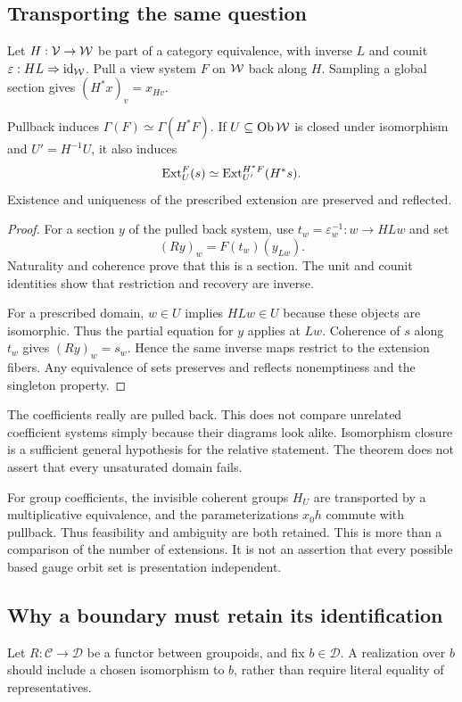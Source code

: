 \label{sec:relative}
\subsection{Transporting the same question}
Let \(H:\mathcal V\to\mathcal W\) be part of a category equivalence, with inverse \(L\) and counit \(\varepsilon:HL\Rightarrow\operatorname{id}_\mathcal W\). Pull a view system \(F\) on \(\mathcal W\) back along \(H\). Sampling a global section gives \((H^*x)_v=x_{Hv}\).

\begin{proposition}\label{KS37}
Pullback induces \(\Gamma(F)\simeq\Gamma(H^*F)\). If \(U\subseteq\operatorname{Ob}\mathcal W\) is closed under isomorphism and \(U'=H^{-1}U\), it also induces
\[
 \operatorname{Ext}_U^F(s)\simeq\operatorname{Ext}_{U'}^{H^*F}(H^*s).
\]
Existence and uniqueness of the prescribed extension are preserved and reflected.
\end{proposition}
\begin{proof}
For a section \(y\) of the pulled back system, use \(t_w=\varepsilon_w^{-1}:w\to HLw\) and set
\[
 (Ry)_w=F(t_w)(y_{Lw}).
\]
Naturality and coherence prove that this is a section. The unit and counit identities show that restriction and recovery are inverse.

For a prescribed domain, \(w\in U\) implies \(HLw\in U\) because these objects are isomorphic. Thus the partial equation for \(y\) applies at \(Lw\). Coherence of \(s\) along \(t_w\) gives \((Ry)_w=s_w\). Hence the same inverse maps restrict to the extension fibers. Any equivalence of sets preserves and reflects nonemptiness and the singleton property.
\end{proof}
The coefficients really are pulled back. This does not compare unrelated coefficient systems simply because their diagrams look alike. Isomorphism closure is a sufficient general hypothesis for the relative statement. The theorem does not assert that every unsaturated domain fails.

For group coefficients, the invisible coherent groups \(H_U\) are transported by a multiplicative equivalence, and the parameterizations \(x_0h\) commute with pullback. Thus feasibility and ambiguity are both retained. This is more than a comparison of the number of extensions. It is not an assertion that every possible based gauge orbit set is presentation independent.

\subsection{Why a boundary must retain its identification}
Let \(R:\mathcal C\to\mathcal D\) be a functor between groupoids, and fix \(b\in\mathcal D\). A realization over \(b\) should include a chosen isomorphism to \(b\), rather than require literal equality of representatives.

